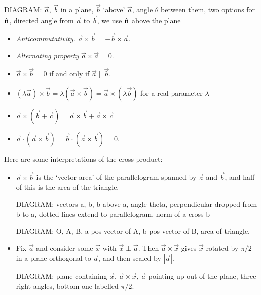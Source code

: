 \documentclass{../../template/note}
\begin{document}
    
    
    
    DIAGRAM: \(\vec a\), \(\vec b\) in a plane, \(\vec b\) `above' \(\vec a\), angle \(\theta\) between them, two options for \(\hvec n\), directed angle from \(\vec a\) to \(\vec b\), we use \(\hvec n\) above the plane

    \begin{itemize}
        \item \emph{Anticommutativity.} \(\vec a \times \vec b = -\vec b \times \vec a\).
        \item \emph{Alternating property} \(\vec a \times \vec a = 0\).
        \item \(\vec a \times \vec b = 0\) if and only if \(\vec a \parallel \vec b\).
        \item \((\lambda \vec a) \times \vec b = \lambda (\vec a \times \vec b) = \vec a \times (\lambda \vec b)\) for a real parameter \(\lambda\)
        \item \(\vec a \times (\vec b + \vec c) = \vec a \times \vec b + \vec a \times \vec c\)
        \item \(\vec a \cdot (\vec a \times \vec b) = \vec b \cdot (\vec a \times \vec b) = 0\).
    \end{itemize}
    
    Here are some interpretations of the cross product:

    \begin{itemize}
        \item \(\vec a \times \vec b\) is the `vector area' of the parallelogram spanned by \(\vec a\) and \(\vec b\), and half of this is the area of the triangle.
        
    
        DIAGRAM: vectors a, b, b above a, angle theta, perpendicular dropped from b to a, dotted lines extend to parallelogram, norm of a cross b

        DIAGRAM: O, A, B, a pos vector of A, b pos vector of B, area of triangle.

    \end{itemize}
    

    \begin{itemize}[resume]
        \item Fix \(\vec a\) and consider some \(\vec x\) with \(\vec x \perp \vec a\). Then \(\vec a \times \vec x\) gives \(\vec x\) rotated by \(\pi/2\) in a plane orthogonal to \(\vec a\), and then scaled by \(|\vec a|\).
        
        DIAGRAM: plane containing \(\vec x\), \(\vec a \times \vec x\), \(\vec a\) pointing up out of the plane, three right angles, bottom one labelled \(\pi/2\).
    \end{itemize}
    
\end{document}
